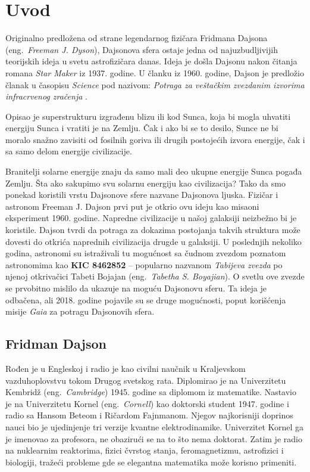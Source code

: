 \documentclass[a4paper]{article}
\begin{document}
\section{Uvod}
\label{sec:uvod}
Originalno predložena od strane legendarnog fizičara Fridmana 
Dajsona (eng.~{\em Freeman J. Dyson}), Dajsonova sfera ostaje jedna od najuzbudljivijih teorijskih ideja u svetu astrofizičara danas. Ideja je došla Dajsonu nakon čitanja romana {\em Star Maker} iz 1937. godine. U članku iz 1960. godine, Dajson je predložio članak u časopisu {\em Science} pod nazivom: {\em Potraga za veštačkim zvezdanim izvorima infracrvenog zračenja} \cite{firstpaper}.

Opisao je superstrukturu izgrađenu blizu ili
kod Sunca, koja bi mogla uhvatiti energiju Sunca i vratiti je na Zemlju. Čak i ako bi se to desilo, Sunce ne bi moralo snažno zavisiti od fosilnih goriva ili drugih postojećih izvora energije, čak i sa samo delom energije civilizacije.

Branitelji solarne energije znaju da samo mali deo ukupne energije Sunca pogađa Zemlju. Šta ako sakupimo svu solarnu energiju kao civilizacija? Tako da smo ponekad koristili vrstu Dajsonove sfere nazvane Dajsonova ljuska. Fizičar i astronom Freeman J. Dajson prvi put je otkrio ovu ideju kao misaoni eksperiment 1960. godine. Napredne civilizacije u našoj galaksiji neizbežno bi je koristile. Dajson tvrdi da potraga za dokazima postojanja takvih struktura može dovesti do otkrića naprednih civilizacija drugde u galaksiji.
U poslednjih nekoliko godina, astronomi su istraživali tu mogućnost sa čudnom zvezdom poznatom astronomima kao \textbf{KIC 8462852} – popularno nazvanom {\em Tabijeva zvezda} po njenoj otkrivačici Tabeti Bojajan (eng.~{\em Tabetha S. Boyajian}). O svetlu ove zvezde se prvobitno mislilo da ukazuje na moguću Dajsonovu sferu. Ta ideja je odbačena, ali 2018. godine pojavile su se druge mogućnosti, poput korišćenja misije {\em Gaia} za potragu Dajsonovih sfera.


\subsection{Fridman Dajson}
Rođen je u Engleskoj i radio je kao civilni naučnik u Kraljevskom vazduhoplovstvu tokom Drugog svetskog rata. Diplomirao je na Univerzitetu Kembridž (eng.~{\em Cambridge}) 1945. godine sa diplomom iz matematike. Nastavio je na Univerzitetu Kornel (eng.~{\em Cornell}) kao doktorski student 1947. godine i radio sa Hansom Beteom i Ričardom Fajnmanom. Njegov najkorisniji doprinos nauci bio je ujedinjenje tri verzije kvantne elektrodinamike. Univerzitet Kornel ga je imenovao za profesora, ne obazirući se na to što nema doktorat. Zatim je radio na nuklearnim reaktorima, fizici čvrstog stanja, feromagnetizmu, astrofizici i biologiji, tražeći probleme gde se elegantna matematika može korisno primeniti. 
\end{document}
